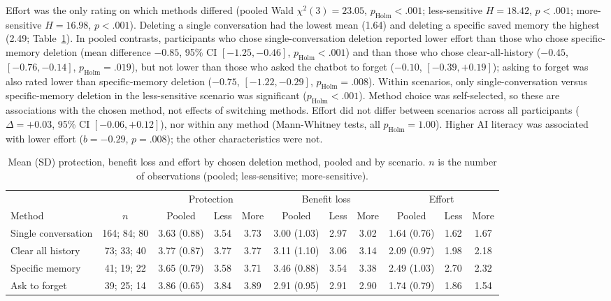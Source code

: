 \documentclass[conference,compsoc]{IEEEtran}
\begin{document}
Effort was the only rating on which methods differed (pooled Wald $\chi^2(3)=23.05$, $p_{\mathrm{Holm}}<.001$; less-sensitive $H=18.42$, $p<.001$; more-sensitive $H=16.98$, $p<.001$). Deleting a single conversation had the lowest mean (1.64) and deleting a specific saved memory the highest (2.49; Table~\ref{tab:method-scales}). In pooled contrasts, participants who chose single-conversation deletion reported lower effort than those who chose specific-memory deletion (mean difference $-0.85$, 95\% CI $[-1.25, -0.46]$, $p_{\mathrm{Holm}}<.001$) and than those who chose clear-all-history ($-0.45$, $[-0.76, -0.14]$, $p_{\mathrm{Holm}}=.019$), but not lower than those who asked the chatbot to forget ($-0.10$, $[-0.39, +0.19]$); asking to forget was also rated lower than specific-memory deletion ($-0.75$, $[-1.22, -0.29]$, $p_{\mathrm{Holm}}=.008$). Within scenarios, only single-conversation versus specific-memory deletion in the less-sensitive scenario was significant ($p_{\mathrm{Holm}}<.001$). Method choice was self-selected, so these are associations with the chosen method, not effects of switching methods. Effort did not differ between scenarios across all participants ($\Delta=+0.03$, 95\% CI $[-0.06, +0.12]$), nor within any method (Mann-Whitney tests, all $p_{\mathrm{Holm}}=1.00$). Higher AI literacy was associated with lower effort ($b=-0.29$, $p=.008$); the other characteristics were not.

\begin{table}[t]
\centering
\caption{Mean (SD) protection, benefit loss and effort by chosen deletion method, pooled and by scenario. $n$ is the number of observations (pooled; less-sensitive; more-sensitive).}
\label{tab:method-scales}
\small
\setlength{\tabcolsep}{4pt}
\begin{tabular}{lcccccccccc}
\toprule
 & & \multicolumn{3}{c}{Protection} & \multicolumn{3}{c}{Benefit loss} & \multicolumn{3}{c}{Effort} \\
\cmidrule(lr){3-5}\cmidrule(lr){6-8}\cmidrule(lr){9-11}
Method & $n$ & Pooled & Less & More & Pooled & Less & More & Pooled & Less & More \\
\midrule
Single conversation & 164; 84; 80 & 3.63 (0.88) & 3.54 & 3.73 & 3.00 (1.03) & 2.97 & 3.02 & 1.64 (0.76) & 1.62 & 1.67 \\
Clear all history & 73; 33; 40 & 3.77 (0.87) & 3.77 & 3.77 & 3.11 (1.10) & 3.06 & 3.14 & 2.09 (0.97) & 1.98 & 2.18 \\
Specific memory & 41; 19; 22 & 3.65 (0.79) & 3.58 & 3.71 & 3.46 (0.88) & 3.54 & 3.38 & 2.49 (1.03) & 2.70 & 2.32 \\
Ask to forget & 39; 25; 14 & 3.86 (0.65) & 3.84 & 3.89 & 2.91 (0.95) & 2.91 & 2.90 & 1.74 (0.79) & 1.86 & 1.54 \\
\bottomrule
\end{tabular}
\end{table}
\end{document}
